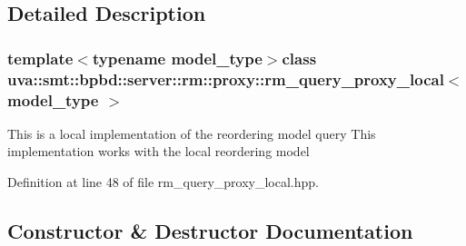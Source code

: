 \subsection{Detailed Description}
\subsubsection*{template$<$typename model\+\_\+type$>$class uva\+::smt\+::bpbd\+::server\+::rm\+::proxy\+::rm\+\_\+query\+\_\+proxy\+\_\+local$<$ model\+\_\+type $>$}

This is a local implementation of the reordering model query This implementation works with the local reordering model 

Definition at line 48 of file rm\+\_\+query\+\_\+proxy\+\_\+local.\+hpp.



\subsection{Constructor \& Destructor Documentation}
\hypertarget{classuva_1_1smt_1_1bpbd_1_1server_1_1rm_1_1proxy_1_1rm__query__proxy__local_a64bf130268d2b56f3a69a73ad3570da1}{}
